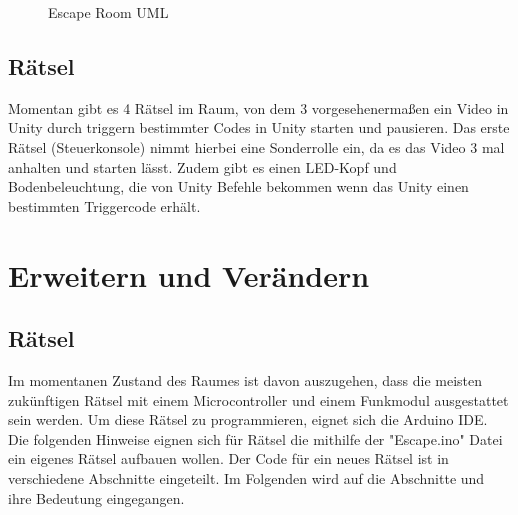 \documentclass[12pt]{article} %
\begin{document}
\begin{figure}[H] %
	\caption{Escape Room UML}
	\label{fig:escape}
\end{figure}

\subsection{Rätsel} %

Momentan gibt es 4 Rätsel im Raum, von dem 3 vorgesehenermaßen ein Video in Unity durch triggern bestimmter Codes in Unity starten und pausieren.
Das erste Rätsel (Steuerkonsole) nimmt hierbei eine Sonderrolle ein, da es das Video 3 mal anhalten und starten lässt. 
Zudem gibt es einen LED-Kopf und Bodenbeleuchtung, die von Unity Befehle bekommen wenn das Unity einen bestimmten Triggercode erhält.



\section{Erweitern und Verändern}

\subsection{Rätsel} %

Im momentanen Zustand des Raumes ist davon auszugehen, dass die meisten zukünftigen Rätsel mit einem Microcontroller und einem Funkmodul ausgestattet sein werden. 
Um diese Rätsel zu programmieren, eignet sich die Arduino IDE. Die folgenden Hinweise eignen sich für Rätsel die mithilfe der "Escape.ino" Datei ein eigenes Rätsel aufbauen wollen.
Der Code für ein neues Rätsel ist in verschiedene Abschnitte eingeteilt. Im Folgenden wird auf die Abschnitte und ihre Bedeutung eingegangen.
\end{document}
